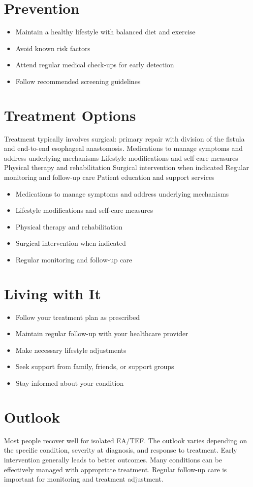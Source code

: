 \section{Prevention}
\begin{itemize}[noitemsep]
  \item Maintain a healthy lifestyle with balanced diet and exercise
  \item Avoid known risk factors
  \item Attend regular medical check-ups for early detection
  \item Follow recommended screening guidelines
\end{itemize}
\section{Treatment Options}
Treatment typically involves surgical: primary repair with division of the fistula and end-to-end esophageal anastomosis. Medications to manage symptoms and address underlying mechanisms Lifestyle modifications and self-care measures Physical therapy and rehabilitation Surgical intervention when indicated Regular monitoring and follow-up care Patient education and support services

\begin{itemize}[noitemsep]
  \item Medications to manage symptoms and address underlying mechanisms
  \item Lifestyle modifications and self-care measures
  \item Physical therapy and rehabilitation
  \item Surgical intervention when indicated
  \item Regular monitoring and follow-up care
\end{itemize}
\section{Living with It}
\begin{itemize}[noitemsep]
  \item Follow your treatment plan as prescribed
  \item Maintain regular follow-up with your healthcare provider
  \item Make necessary lifestyle adjustments
  \item Seek support from family, friends, or support groups
  \item Stay informed about your condition
\end{itemize}
\section{Outlook}
Most people recover well for isolated EA/TEF. The outlook varies depending on the specific condition, severity at diagnosis, and response to treatment. Early intervention generally leads to better outcomes. Many conditions can be effectively managed with appropriate treatment. Regular follow-up care is important for monitoring and treatment adjustment.

